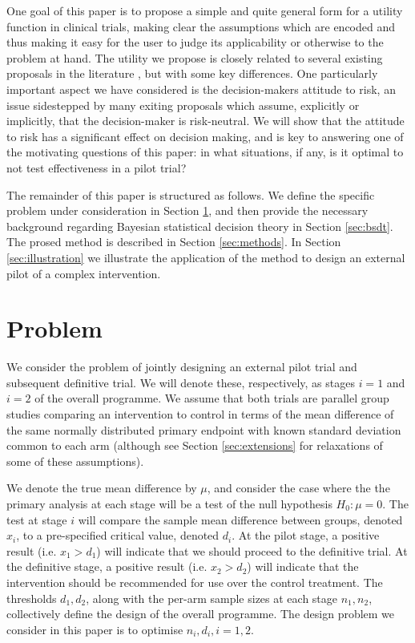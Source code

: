 \documentclass[sagev, Crown]{sagej}
\begin{document}
One goal of this paper is to propose a simple and quite general form for a utility function in clinical trials, making clear the assumptions which are encoded and thus making it easy for the user to judge its applicability or otherwise to the problem at hand. The utility we propose is closely related to several existing proposals in the literature \cite{Pearce2018 ...}, but with some key differences. One particularly important aspect we have considered is the decision-makers attitude to risk, an issue sidestepped by many exiting proposals which assume, explicitly or implicitly, that the decision-maker is risk-neutral. We will show that the attitude to risk has a significant effect on decision making, and is key to answering one of the motivating questions of this paper: in what situations, if any, is it optimal to not test effectiveness in a pilot trial?

The remainder of this paper is structured as follows. We define the specific problem under consideration in Section \ref{sec:problem}, and then provide the necessary background regarding Bayesian statistical decision theory in Section \ref{sec:bsdt}. The prosed method is described in Section \ref{sec:methods}. In Section \ref{sec:illustration} we illustrate the application of the method to design an external pilot of a complex intervention.


\section{Problem}\label{sec:problem}

We consider the problem of jointly designing an external pilot trial and subsequent definitive trial. We will denote these, respectively, as stages $i=1$ and $i=2$ of the overall programme. We assume that both trials are parallel group studies comparing an intervention to control in terms of the mean difference of the same normally distributed primary endpoint with known standard deviation common to each arm (although see Section \ref{sec:extensions} for relaxations of some of these assumptions). 

We denote the true mean difference by $\mu$, and consider the case where the the primary analysis at each stage will be a test of the null hypothesis $H_0: \mu = 0$. The test at stage $i$ will compare the sample mean difference between groups, denoted  $x_i$, to a pre-specified critical value, denoted $d_i$. At the pilot stage, a positive result (i.e. $x_1 > d_1$) will indicate that we should proceed to the definitive trial. At the definitive stage, a positive result (i.e. $x_2 > d_2$) will indicate that the intervention should be recommended for use over the control treatment. The thresholds $d_1, d_2$, along with the per-arm sample sizes at each stage $n_1, n_2$, collectively define the design of the overall programme. The design problem we consider in this paper is to optimise $n_i, d_i, i = 1,2$.
\end{document}
